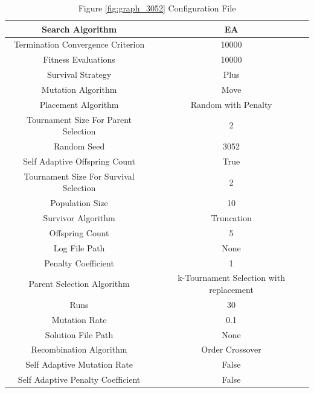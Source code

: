 \documentclass{standalone}
\begin{document}
\begin{table}[!htb]
	\centering
	\caption{Figure \ref{fig:graph_3052} Configuration File}
	\label{tab:graph_3052}
	\begin{tabular}{| c | c |}
		\hline
		Search Algorithm		& EA		 \\
		\hline
		Termination Convergence Criterion		& 10000		 \\
		\hline
		Fitness Evaluations		& 10000		 \\
		\hline
		Survival Strategy		& Plus		 \\
		\hline
		Mutation Algorithm		& Move		 \\
		\hline
		Placement Algorithm		& Random with Penalty		 \\
		\hline
		Tournament Size For Parent Selection		& 2		 \\
		\hline
		Random Seed		& 3052		 \\
		\hline
		Self Adaptive Offspring Count		& True		 \\
		\hline
		Tournament Size For Survival Selection		& 2		 \\
		\hline
		Population Size		& 10		 \\
		\hline
		Survivor Algorithm		& Truncation		 \\
		\hline
		Offspring Count		& 5		 \\
		\hline
		Log File Path		& None		 \\
		\hline
		Penalty Coefficient		& 1		 \\
		\hline
		Parent Selection Algorithm		& k-Tournament Selection with replacement		 \\
		\hline
		Runs		& 30		 \\
		\hline
		Mutation Rate		& 0.1		 \\
		\hline
		Solution File Path		& None		 \\
		\hline
		Recombination Algorithm		& Order Crossover		 \\
		\hline
		Self Adaptive Mutation Rate		& False		 \\
		\hline
		Self Adaptive Penalty Coefficient		& False		 \\
		\hline
	\end{tabular}
\end{table}
\end{document}
